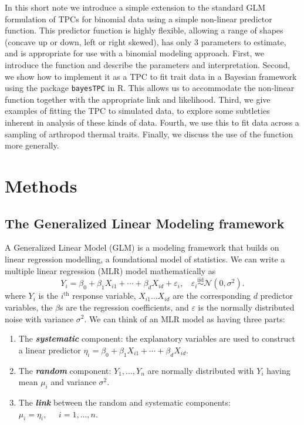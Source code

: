 \documentclass[
]{article}
\providecommand{\tightlist}{%
  \setlength{\itemsep}{0pt}\setlength{\parskip}{0pt}}\usepackage{longtable,booktabs,array}
\begin{document}
In this short note we introduce a simple extension to the standard GLM
formulation of TPCs for binomial data using a simple non-linear
predictor function. This predictor function is highly flexible, allowing
a range of shapes (concave up or down, left or right skewed), has only 3
parameters to estimate, and is appropriate for use with a binomial
modeling approach. First, we introduce the function and describe the
parameters and interpretation. Second, we show how to implement it as a
TPC to fit trait data in a Bayesian framework using the package
\texttt{bayesTPC} in R. This allows us to accommodate the non-linear
function together with the appropriate link and likelihood. Third, we
give examples of fitting the TPC to simulated data, to explore some
subtleties inherent in analysis of these kinds of data. Fourth, we use
this to fit data across a sampling of arthropod thermal traits. Finally,
we discuss the use of the function more generally.

\section{Methods}\label{methods}

\subsection{The Generalized Linear Modeling
framework}\label{the-generalized-linear-modeling-framework}

A Generalized Linear Model (GLM) is a modeling framework that builds on
linear regression modelling, a foundational model of statistics. We can
write a multiple linear regression (MLR) model mathematically as \[
Y_i   = \beta_0 + \beta_1 X_{i1} + \cdots
+ \beta_d X_{id}  + \varepsilon_i, ~~~~  \varepsilon_i \stackrel{\mathrm{iid}}{\sim} \mathcal{N}(0, \sigma^2).
\] where \(Y_i\) is the \(i^{\mathrm{th}}\) response variable,
\(X_{i1} \dots X_{id}\) are the corresponding \(d\) predictor variables,
the \(\beta\)s are the regression coefficients, and \(\varepsilon\) is
the normally distributed noise with variance \(\sigma^2\). We can think
of an MLR model as having three parts:

\begin{enumerate}
\def\labelenumi{\arabic{enumi}.}
\tightlist
\item
  The \textbf{\emph{systematic}} component: the explanatory variables
  are used to construct a linear predictor
  \(\eta_i = \beta_0 + \beta_1 X_{i1} + \cdots + \beta_d X_{id}.\)
\item
  The \textbf{\emph{random}} component: \(Y_1,\dots,Y_n\) are normally
  distributed with \(Y_i\) having mean \(\mu_i\) and variance
  \(\sigma^2\).
\item
  The \textbf{\emph{link}} between the random and systematic components:
  \(\mu_i = \eta_i, \;\;\;\;\; i=1,\dots,n\).
\end{enumerate}
\end{document}

